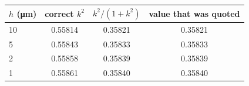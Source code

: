 \begin{tabular}{@{}lccc@{}}
\toprule
$h$ (\si{\micro\meter}) & correct $k^2$ & $k^2/(1+k^2)$ & value that was quoted \\
\midrule
10 & 0.55814 & 0.35821 & 0.35821 \\
5 & 0.55843 & 0.35833 & 0.35833 \\
2 & 0.55858 & 0.35839 & 0.35839 \\
1 & 0.55861 & 0.35840 & 0.35840 \\
\bottomrule
\end{tabular}
